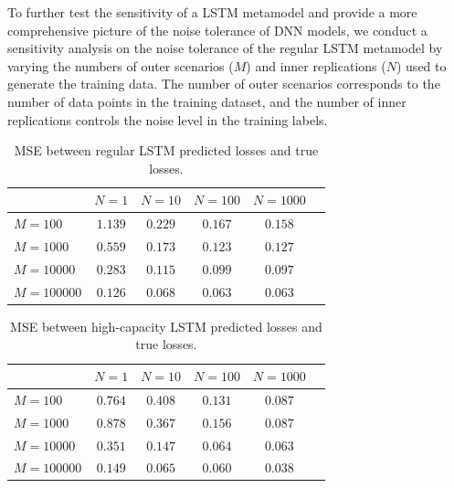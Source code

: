 To further test the sensitivity of a LSTM metamodel and provide a more comprehensive picture of the noise tolerance of DNN models, we conduct a sensitivity analysis on the noise tolerance of the regular LSTM metamodel by varying the numbers of outer scenarios ($M$) and inner replications ($N$) used to generate the training data.
The number of outer scenarios corresponds to the number of data points in the training dataset, and the number of inner replications controls the noise level in the training labels.

\begin{table}[ht!]
    \small
    \centering
    \begin{tabular}{lccccc}
        \toprule
                            & $N=1$ & $N=10$  & $N=100$ & $N=\num{1000}$\\
        \midrule
        $M = 100$           & $1.139$ & $0.229$ & $0.167$ & $0.158$ \\
        $M = \num{1000}$     & $0.559$ & $0.173$ & $0.123$ & $0.127$ \\
        $M = \num{10000}$    & $0.283$ & $0.115$ & $0.099$ & $0.097$ \\
        $M = \num{100000}$   & $0.126$ & $0.068$ & $0.063$ & $0.063$ \\
        \bottomrule
    \end{tabular}
    \caption{MSE between regular LSTM predicted losses and true losses.}
    \label{tab2:lstm_sens}
\end{table}

\begin{table}[ht!]
    \small
    \centering
    \begin{tabular}{lccccc}
        \toprule
                          & $N=1$ & $N=10$  & $N=100$ & $N=\num{1000}$\\
        \midrule
        $M = 100$           & $0.764$ & $0.408$ & $0.131$ & $0.087$ \\
        $M = \num{1000}$     & $0.878$ & $0.367$ & $0.156$ & $0.087$ \\
        $M = \num{10000}$    & $0.351$ & $0.147$ & $0.064$ & $0.063$ \\
        $M = \num{100000}$   & $0.149$ & $0.065$ & $0.060$ & $0.038$ \\
        \bottomrule
    \end{tabular}
    \caption{MSE between high-capacity LSTM predicted losses and true losses.}
    \label{tab2:hicaplstm_sens}
\end{table}



